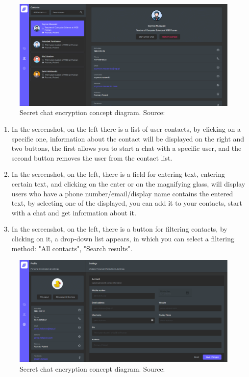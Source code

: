 \begin{figure}[H]
    \centering
    \includegraphics[width=1\textwidth]{Pictures/Messenger-2}
    \caption{Secret chat encryption concept diagram. Source: }\label{fig:figure10}
\end{figure}
\begin{enumerate}
    \item In the screenshot, on the left there is a list of user contacts, by clicking on a specific one,
    information about the contact will be displayed on the right and two buttons,
    the first allows you to start a chat with a specific user, and the second button removes the user from the contact list.
    \item In the screenshot, on the left, there is a field for entering text, entering certain text, and clicking on the enter or on the magnifying glass,
    will display users who have a phone number/email/display name contains the entered text,
    by selecting one of the displayed, you can add it to your contacts, start with a chat and get information about it.
    \item In the screenshot, on the left, there is a button for filtering contacts, by clicking on it, a drop-down list appears,
    in which you can select a filtering method: "All contacts", "Search results".
\end{enumerate}

\begin{figure}[H]
    \centering
    \includegraphics[width=1\textwidth]{Pictures/Messenger-3}
    \caption{Secret chat encryption concept diagram. Source: }\label{fig:figure11}
\end{figure}
\begin{enumerate}
\end{enumerate}